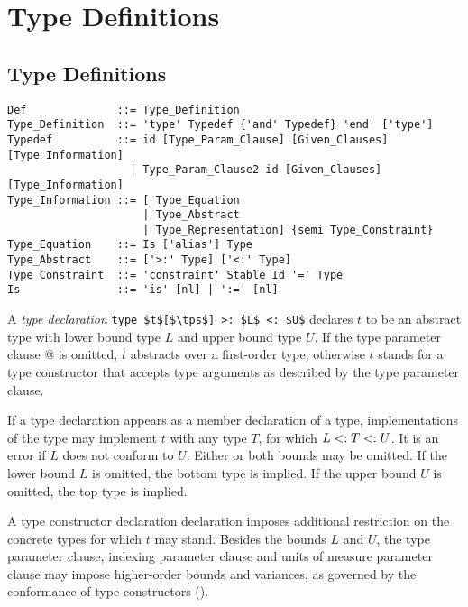 
\chapter{Type Definitions}

\minitoc

\newpage

\section{Type Definitions}
\label{sec:type-decls-aliases}

\syntax\begin{lstlisting}
Def              ::= Type_Definition
Type_Definition  ::= 'type' Typedef {'and' Typedef} 'end' ['type']
Typedef          ::= id [Type_Param_Clause] [Given_Clauses] [Type_Information]
                   | Type_Param_Clause2 id [Given_Clauses] [Type_Information]
Type_Information ::= [ Type_Equation 
                     | Type_Abstract 
                     | Type_Representation] {semi Type_Constraint}
Type_Equation    ::= Is ['alias'] Type
Type_Abstract    ::= ['>:' Type] ['<:' Type]
Type_Constraint  ::= 'constraint' Stable_Id '=' Type
Is               ::= 'is' [nl] | ':=' [nl]
\end{lstlisting}

A {\em type declaration} \lstinline!type $t$[$\tps$] >: $L$ <: $U$! declares $t$ to be an abstract type with lower bound type $L$ and upper bound type $U$. If the type parameter clause \lstinline@[$\tps$]@ is omitted, $t$ abstracts over a first-order type, otherwise $t$ stands for a type constructor that accepts type arguments as described by the type parameter clause. 

If a type declaration appears as a member declaration of a type, implementations of the type may implement $t$ with any type $T$, for which $L <: T <: U$. It is an error if $L$ does not conform to $U$. Either or both bounds may be omitted. If the lower bound $L$ is omitted, the bottom type  is implied. If the upper bound $U$ is omitted, the top type  is implied. 

A type constructor declaration declaration imposes additional restriction on the concrete types for which $t$ may stand. Besides the bounds $L$ and $U$, the type parameter clause, indexing parameter clause and units of measure parameter clause may impose higher-order bounds and variances, as governed by the conformance of type constructors ().


